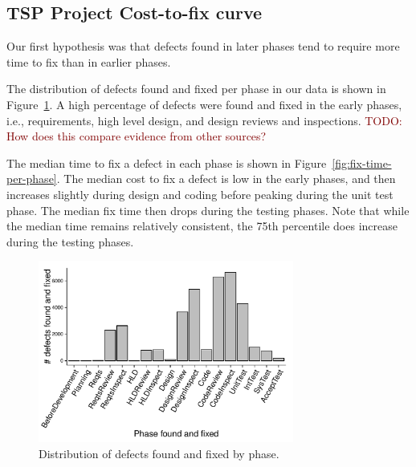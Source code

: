 \documentclass{sig-alternate}
\newcommand{\todo}[1]{\textcolor{Maroon}{TODO: #1}}
\newcommand{\fig}[1]{Figure~\ref{fig:#1}}
\begin{document}
\subsection{TSP Project Cost-to-fix curve}

Our first hypothesis was that defects found in later phases tend to require more time to fix than in earlier phases.

The distribution of defects found and fixed per phase in our data is shown in Figure~\ref{fig:fix-phase-dist}. A high percentage of defects were found and fixed in the early phases, i.e., requirements, high level design, and design reviews and inspections. \todo{How does this compare evidence from other sources?}

The median time to fix a defect in each phase is shown in \fig{fix-time-per-phase}. The median cost to fix a defect is low in the early phases, and then increases slightly during design and coding before peaking during the unit test phase. The median fix time then drops during the testing phases. Note that while the median time remains relatively consistent, the 75th percentile does increase during the testing phases.

\begin{figure}[!ht]
\begin{center}
\includegraphics[width=3.3in]{fix-phase-dist.pdf}
\end{center}
\caption{Distribution of defects found and fixed by phase.}
\label{fig:fix-phase-dist}
\end{figure}
\end{document}
